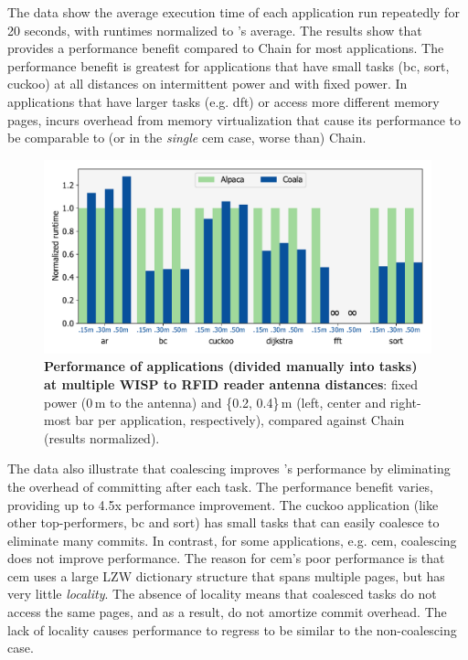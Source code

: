 The data show the average execution time of each application run repeatedly for 20 seconds, with runtimes normalized to \sys's average. The results show that \sys provides a performance benefit compared to Chain for most applications. The performance benefit is greatest for applications that have small tasks (bc, sort, cuckoo) at all distances on intermittent power and with fixed power. In applications that have larger tasks (e.g. dft) or access more different memory pages, \sys incurs overhead from memory virtualization that cause its performance to be comparable to (or in the \emph{single} cem case, worse than) Chain. 

\begin{figure}
	\centering
	\includegraphics[width=\columnwidth]{figures/coala_alpaca_gcc}
	\caption{\textbf{Performance of \sys applications (divided manually into tasks) at multiple WISP to RFID reader antenna distances}: fixed power (0\,m to the antenna) and \{0.2, 0.4\}\,m (left, center and right-most bar per application, respectively), compared against Chain (results normalized).}
	\label{fig:runtime}
\end{figure}

The data also illustrate that coalescing improves \sys's performance by eliminating the overhead of committing after each task. The performance benefit varies, providing up to 4.5x performance improvement. The cuckoo application (like other top-performers, bc and sort) has small tasks that \sys can easily coalesce to eliminate many commits. In contrast, for some applications, e.g. cem, coalescing does not improve performance. The reason for cem's poor performance is that cem uses a large LZW dictionary structure that spans multiple pages, but has very little {\em locality}. The absence of locality means that coalesced tasks do not access the same pages, and as a result, do not amortize commit overhead. The lack of locality causes performance to regress to be similar to the non-coalescing case. 

